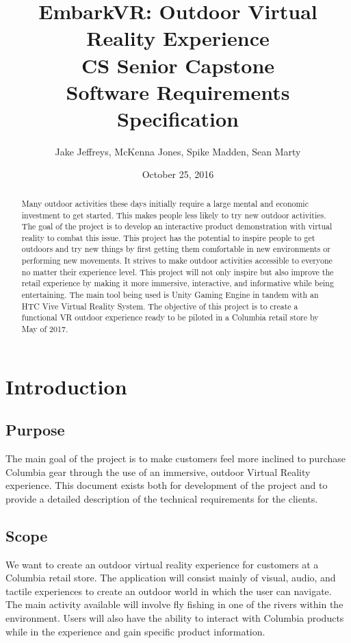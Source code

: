 \documentclass[10pt,journal,compsoc,onecolumn, draftclsnofoot]{IEEEtran}
\title{
EmbarkVR: Outdoor Virtual Reality Experience \\
CS Senior Capstone \\
Software Requirements Specification \\
\vspace{2cm}
}
\author{Jake Jeffreys, McKenna Jones, Spike Madden, Sean Marty}
\date{October 25, 2016}
\begin{document}
\begin{titlepage}
\vspace{3cm}
\maketitle
\vspace{3cm}
\begin{abstract}
Many outdoor activities these days initially require a large mental and economic
investment to get started. This makes people less likely to try new outdoor
activities. The goal of the project is to develop an interactive product
demonstration with virtual reality to combat this issue. This project has the
potential to inspire people to get outdoors and try new things by first getting
them comfortable in new environments or performing new movements. It strives to
make outdoor activities accessible to everyone no matter their experience level.
This project will not only inspire but also improve the retail experience by
making it more immersive, interactive, and informative while being
entertaining. The main tool being used is Unity Gaming Engine in tandem with an
HTC Vive Virtual Reality System. The objective of this project is to create a
functional VR outdoor experience ready to be piloted in a Columbia retail store
by May of 2017.
\end{abstract}

\end{titlepage}

\tableofcontents
\clearpage
\section{Introduction}

\subsection{Purpose}
The main goal of the project is to make customers feel more inclined to purchase
Columbia gear through the use of an immersive, outdoor Virtual Reality
experience. This document exists both for development of the project and to provide a detailed description of the technical requirements for the clients.

\subsection{Scope}
We want to create an outdoor virtual reality experience for customers at a
Columbia retail store. The application will consist mainly of visual, audio, and tactile
experiences to create an outdoor world in which the user can navigate. The main
activity available will involve fly fishing in one of the rivers within the
environment. Users will also have the ability to interact with Columbia products
while in the experience and gain specific product information.
\end{document}
